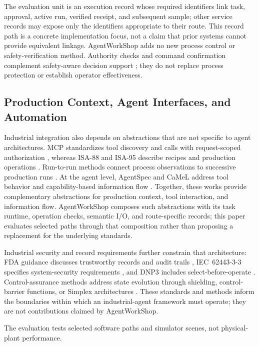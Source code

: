 The evaluation unit is an execution record whose required identifiers link
task, approval, active run, verified receipt, and subsequent sample; other
service records may expose only the identifiers appropriate to their route.
This record path is a concrete implementation focus, not a claim that prior
systems cannot provide equivalent linkage. AgentWorkShop adds no new process
control or safety-verification method. Authority checks and command
confirmation complement safety-aware decision support
\cite{jiang2026agentic}; they do not replace process protection or establish
operator effectiveness.

\subsection{Production Context, Agent Interfaces, and Automation}
Industrial integration also depends on abstractions that are not specific to
agent architectures. MCP standardizes tool discovery and calls with
request-scoped authorization \cite{mcp2024}, whereas
ISA-88 and ISA-95 describe recipes and production operations
\cite{isa88_2010,isa95_2025}. Run-to-run methods connect process observations
to successive production runs \cite{moyne2000r2r}. At the agent level,
AgentSpec and CaMeL address tool behavior and capability-based information
flow \cite{wang2025agentspec,debenedetti2025camel}. Together, these works
provide complementary abstractions for production context, tool interaction,
and information flow. AgentWorkShop composes such abstractions with its task
runtime, operation checks, semantic I/O, and route-specific records; this
paper evaluates selected paths through that composition rather than proposing
a replacement for the underlying standards.

Industrial security and record requirements further constrain that
architecture: FDA guidance discusses trustworthy records and audit trails
\cite{part11}, IEC~62443-3-3 specifies system-security requirements
\cite{iec62443-3-3}, and DNP3 includes select-before-operate
\cite{ieee1815dnp3}. Control-assurance methods address state evolution through
shielding, control-barrier functions, or Simplex architectures
\cite{alshiekh2018shielding,ames2017cbf,sha2001simplex}. These standards and
methods inform the boundaries within which an industrial-agent framework must
operate; they are not contributions claimed by AgentWorkShop.

The evaluation tests selected software paths and simulator scenes, not
physical-plant performance.
